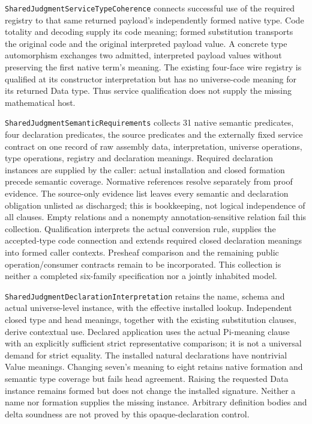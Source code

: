 \documentclass[11pt]{article}
\theoremstyle{definition}
\theoremstyle{remark}
\begin{document}
\nolinkurl{SharedJudgmentServiceTypeCoherence} connects successful use of
the required registry to that same returned payload's independently formed
native type. Code totality and decoding supply its code meaning; formed
substitution transports the original code and the original interpreted
payload value. A concrete type automorphism exchanges two admitted,
interpreted payload values without preserving the first native term's
meaning. The existing four-face wire registry is qualified at its constructor
interpretation but has no universe-code meaning for its returned Data type.
Thus service qualification does not supply the missing mathematical host.

\nolinkurl{SharedJudgmentSemanticRequirements} collects 31 native semantic
predicates, four declaration predicates, the source predicates and the
externally fixed service contract on one record of raw assembly data,
interpretation, universe operations, type operations, registry and declaration
meanings. Required declaration instances are supplied by the caller: actual
installation and closed formation precede semantic coverage. Normative
references resolve separately from proof evidence. The source-only evidence
list leaves every semantic and declaration obligation unlisted as discharged; this is
bookkeeping, not logical independence of all clauses. Empty relations and a nonempty
annotation-sensitive relation fail this collection. Qualification interprets
the actual conversion rule, supplies the accepted-type code connection and
extends required closed declaration meanings into formed caller contexts.
Presheaf comparison and the remaining public operation/consumer contracts
remain to be incorporated. This collection is neither
a completed six-family specification nor a jointly inhabited model.

\nolinkurl{SharedJudgmentDeclarationInterpretation} retains the name, schema
and actual universe-level instance, with the effective installed lookup.
Independent closed type and head meanings, together with the existing
substitution clauses, derive contextual use. Declared application uses the
actual Pi-meaning clause with an explicitly sufficient strict representative
comparison; it is not a universal demand for strict equality. The installed
natural declarations have nontrivial Value meanings. Changing seven's meaning
to eight retains native formation and semantic type coverage but fails head
agreement. Raising the requested Data instance remains formed but does not
change the installed signature. Neither a name nor formation supplies the
missing instance. Arbitrary definition bodies and delta soundness are not
proved by this opaque-declaration control.
\end{document}
